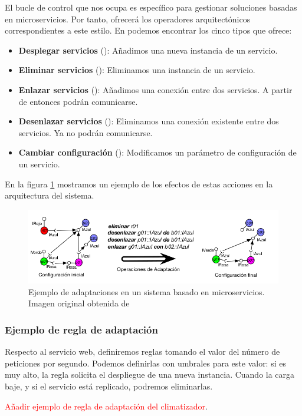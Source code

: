 El bucle de control que nos ocupa es específico para gestionar soluciones basadas en microservicios. Por tanto, ofrecerá los operadores arquitectónicos correspondientes a este estilo. En \cite{fonsEspecificacionSistemasAutoadaptativos2021} podemos encontrar los cinco tipos que ofrece:

\begin{itemize}
  \item \textbf{Desplegar servicios} (\textbf{}): Añadimos una nueva instancia de un servicio.

  \item \textbf{Eliminar servicios} (\textbf{}): Eliminamos una instancia de un servicio.

  \item \textbf{Enlazar servicios} (\textbf{}): Añadimos una conexión entre dos servicios. A partir de entonces podrán comunicarse.

  \item \textbf{Desenlazar servicios} (\textbf{}): Eliminamos una conexión existente entre dos servicios. Ya no podrán comunicarse.

  \item \textbf{Cambiar configuración} (\textbf{}): Modificamos un parámetro de configuración de un servicio.
\end{itemize}

En la figura \ref{fig:adaptaciones-microservicios} mostramos un ejemplo de los efectos de estas acciones en la arquitectura del sistema.

\begin{figure}[htb]
  \centering
  \includegraphics[scale=1.8]{cap_sistema_original/images/adaptaciones}
  \caption[Ejemplo de adaptaciones en un sistema basado en microservicios.]{Ejemplo de adaptaciones en un sistema basado en microservicios. Imagen original obtenida de \cite{fonsServiciosAdaptivereadyPara2021}}
  \label{fig:adaptaciones-microservicios}
\end{figure}

\subsubsection{Ejemplo de regla de adaptación}


Respecto al servicio web, definiremos reglas tomando el valor del número de peticiones por segundo. Podemos definirlas con umbrales para este valor: si es muy alto, la regla solicita el despliegue de una nueva instancia. Cuando la carga baje, y si el servicio está replicado, podremos eliminarlas.

\textcolor{red}{Añadir ejemplo de regla de adaptación del climatizador}.
